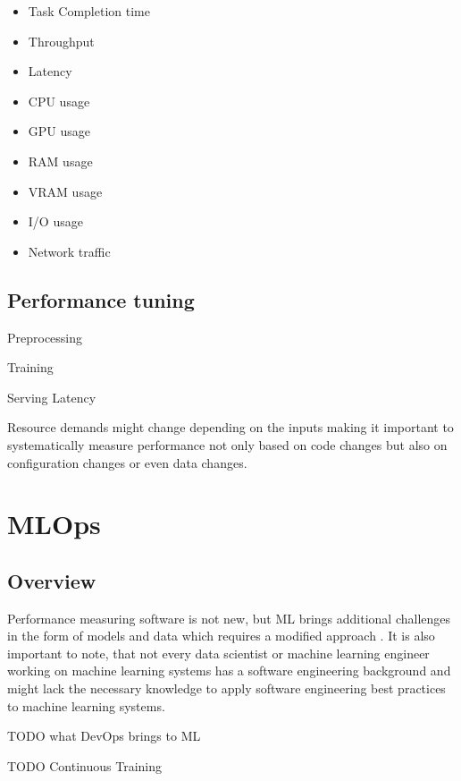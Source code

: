 \begin{itemize}
    \item Task Completion time
    \item Throughput
    \item Latency
    \item CPU usage
    \item GPU usage
    \item RAM usage
    \item VRAM usage
    \item I/O usage
    \item Network traffic
\end{itemize}

\subsection{Performance tuning}

Preprocessing

Training

Serving Latency

Resource demands might change depending on the inputs \parencite{brunnertPerformanceorientedDevOpsResearch2015} making it important to systematically measure performance not only based on code changes but also on configuration changes or even data changes.

\section{MLOps}
\label{sec:mldevops}

\subsection{Overview}
Performance measuring software is not new, but ML brings additional challenges in the form of models and data which requires a modified approach \parencite{breckMLTestScore2017a}. It is also important to note, that not every data scientist or machine learning engineer working on machine learning systems has a software engineering background \parencite{finzerDataScienceEducation2013} and might lack the necessary knowledge to apply software engineering best practices to machine learning systems.

TODO what DevOps brings to ML

TODO Continuous Training


